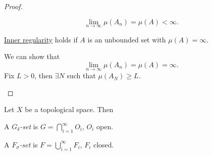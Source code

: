 \begin{proof}
\begin{enumerate}[(1)]
\begin{explanation}
			      \[
				      \lim\limits_{n \to \infty} \mu (A_{n}) = \mu (A) < \infty .
			      \]
		      \end{explanation}
		      \begin{claim}
			      \hyperref[thm:inner-regularity]{Inner regularity} holds if \(A\) is an unbounded set with \(\mu (A) = \infty \).
		      \end{claim}
		      \begin{explanation}
			      We can show that
			      \[
				      \lim\limits_{n \to \infty} \mu (A_{n}) = \mu (A) = \infty.
			      \]
			      Fix \(L>0\), then \(\exists N\) such that \(\mu (A_{N})\geq L\).
		      \end{explanation}
	\end{enumerate}
\end{proof}

\begin{definition*}
	Let \(X\) be a topological space. Then
	\begin{definition}\label{def:G-delta-set}
		A \emph{\(G_{\delta}\)-set} is \(G = \bigcap_{i=1}^{\infty} O_{i}\), \(O_{i}\) open.
	\end{definition}

	\begin{definition}\label{def:F-sigma-set}
		A \emph{\(F_{\sigma}\)-set} is \(F = \bigcup_{i=1}^{\infty} F_{i}\), \(F_{i}\) closed.
	\end{definition}
\end{definition*}

